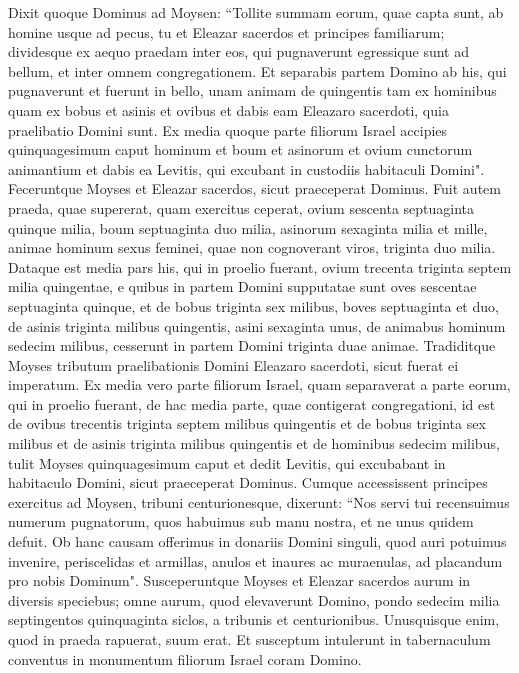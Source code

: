 \begin{biblechapter}
\verse Dixit quoque Dominus ad Moysen: 
\verse “Tollite summam eorum, quae capta sunt, ab homine usque ad pecus, tu et Eleazar sacerdos et principes familiarum;  
\verse dividesque ex aequo praedam inter eos, qui pugnaverunt egressique sunt ad bellum, et inter omnem congregationem. 
\verse Et separabis partem Domino ab his, qui pugnaverunt et fuerunt in bello, unam animam de quingentis tam ex hominibus quam ex bobus et asinis et ovibus 
\verse et dabis eam Eleazaro sacerdoti, quia praelibatio Domini sunt. 
\verse Ex media quoque parte filiorum Israel accipies quinquagesimum caput hominum et boum et asinorum et ovium cunctorum animantium et dabis ea Levitis, qui excubant in custodiis habitaculi Domini". 
\verse Feceruntque Moyses et Eleazar sacerdos, sicut praeceperat Dominus. 
\verse Fuit autem praeda, quae supererat, quam exercitus ceperat, ovium sescenta septuaginta quinque milia, 
\verse boum septuaginta duo milia, 
\verse asinorum sexaginta milia et mille, 
\verse animae hominum sexus feminei, quae non cognoverant viros, triginta duo milia. 
\verse Dataque est media pars his, qui in proelio fuerant, ovium trecenta triginta septem milia quingentae, 
\verse e quibus in partem Domini supputatae sunt oves sescentae septuaginta quinque,  
\verse et de bobus triginta sex milibus, boves septuaginta et duo, 
\verse de asinis triginta milibus quingentis, asini sexaginta unus, 
\verse de animabus hominum sedecim milibus, cesserunt in partem Domini triginta duae animae. 
\verse Tradiditque Moyses tributum praelibationis Domini Eleazaro sacerdoti, sicut fuerat ei imperatum. 
\verse Ex media vero parte filiorum Israel, quam separaverat a parte eorum, qui in proelio fuerant, 
\verse de hac media parte, quae contigerat congregationi, id est de ovibus trecentis triginta septem milibus quingentis 
\verse et de bobus triginta sex milibus 
\verse et de asinis triginta milibus quingentis 
\verse et de hominibus sedecim milibus, 
\verse tulit Moyses quinquagesimum caput et dedit Levitis, qui excubabant in habitaculo Domini, sicut praeceperat Dominus. 
\verse Cumque accessissent principes exercitus ad Moysen, tribuni centurionesque, dixerunt: 
\verse “Nos servi tui recensuimus numerum pugnatorum, quos habuimus sub manu nostra, et ne unus quidem defuit. 
\verse Ob hanc causam offerimus in donariis Domini singuli, quod auri potuimus invenire, periscelidas et armillas, anulos et inaures ac muraenulas, ad placandum pro nobis Dominum". 
\verse Susceperuntque Moyses et Eleazar sacerdos aurum in diversis speciebus; 
\verse omne aurum, quod elevaverunt Domino, pondo sedecim milia septingentos quinquaginta siclos, a tribunis et centurionibus. 
\verse Unusquisque enim, quod in praeda rapuerat, suum erat. 
\verse Et susceptum intulerunt in tabernaculum conventus in monumentum filiorum Israel coram Domino. 
\end{biblechapter}

